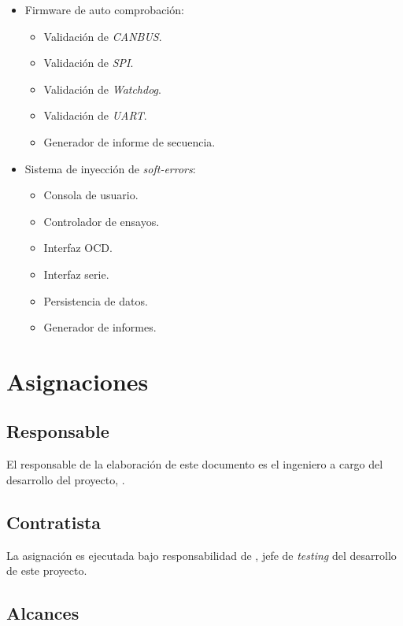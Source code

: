 \documentclass[
	14pt,
	a4paper
]{article}
\begin{document}
\begin{itemize}
	\item Firmware de auto comprobación:
		\begin{itemize}
			\item Validación de \emph{CANBUS}.
			\item Validación de \emph{SPI}.
			\item Validación de \emph{Watchdog}.
			\item Validación de \emph{UART}.
			\item Generador de informe de secuencia.
		\end{itemize}
	\item Sistema de inyección de \emph{soft-errors}:
		\begin{itemize}
			\item Consola de usuario.
			\item Controlador de ensayos.
			\item Interfaz OCD.
			\item Interfaz serie.
			\item Persistencia de datos.
			\item Generador de informes.
		\end{itemize}
\end{itemize}


\section{Asignaciones}
\label{sec:asignaciones}


\subsection{Responsable}
\label{sub:responsable}

El responsable de la elaboración de este documento es el ingeniero a cargo del desarrollo del proyecto, \MyAuthor.

\subsection{Contratista}
\label{sub:contratista}

La asignación es ejecutada bajo responsabilidad de \MyAuthor, jefe de \emph{testing} del desarrollo de este proyecto.

\subsection{Alcances}
\label{sub:alcances}
\end{document}
